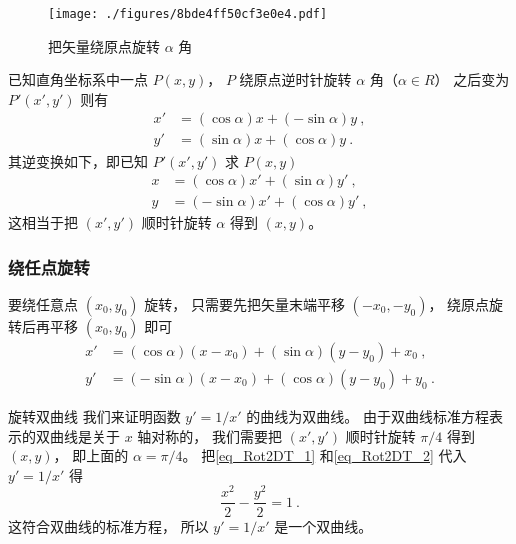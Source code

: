 
\begin{issues}
\issueDraft

\end{issues}




\begin{figure}[ht]
\centering
\texttt{[image: ./figures/8bde4ff50cf3e0e4.pdf]}
\caption{把矢量绕原点旋转 $\alpha$ 角} \label{fig_Rot2DT_1}
\end{figure}

已知直角坐标系中一点 $P(x,y)$， $P$ 绕原点逆时针旋转 $\alpha $ 角（$\alpha  \in R$） 之后变为 $P'(x',y')$ 则有
\begin{align}\label{eq_Rot2DT_1}
x' &= (\cos \alpha)x + (- \sin \alpha)y ~,\\
\label{eq_Rot2DT_2}
y' &= (\sin \alpha)x + (\cos \alpha)y~.
\end{align}
其逆变换如下，即已知 $P'(x',y')$ 求 $P(x,y)$ 
\begin{align}\label{eq_Rot2DT_3}
x &= ( \cos \alpha  )x' + ( \sin \alpha  )y' ~,\\
\label{eq_Rot2DT_4}
y &= ( - \sin \alpha)x' + ( \cos \alpha )y'~,
\end{align}
这相当于把 $(x', y')$ 顺时针旋转 $\alpha$ 得到 $(x, y)$。

\subsubsection{绕任点旋转}
要绕任意点 $(x_0, y_0)$ 旋转， 只需要先把矢量末端平移 $(-x_0, -y_0)$， 绕原点旋转后再平移 $(x_0, y_0)$ 即可
\begin{equation}\label{eq_Rot2DT_5}
\begin{aligned}
x' &= ( \cos \alpha  )(x-x_0) + ( \sin \alpha  )(y-y_0) + x_0 ~,\\
y' &= ( - \sin \alpha)(x-x_0) + ( \cos \alpha )(y-y_0) + y_0~.
\end{aligned}
\end{equation}

\begin{example}{旋转双曲线}
我们来证明函数 $y' = 1/x'$ 的曲线为双曲线。 由于双曲线标准方程表示的双曲线是关于 $x$ 轴对称的， 我们需要把 $(x', y')$ 顺时针旋转 $\pi/4$ 得到 $(x, y)$， 即上面的 $\alpha = \pi/4$。 把\autoref{eq_Rot2DT_1} 和\autoref{eq_Rot2DT_2} 代入 $y' = 1/x'$ 得
\begin{equation}
\frac{x^2}{2} - \frac{y^2}{2} = 1~.
\end{equation}
这符合双曲线的标准方程， 所以 $y' = 1/x'$ 是一个双曲线。
\end{example}

